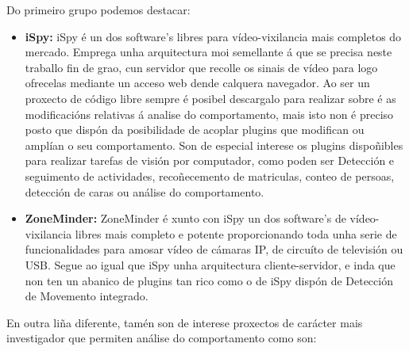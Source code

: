         Do primeiro grupo podemos destacar:
        \begin{itemize}
         \item \textbf{iSpy:}\cite{iSpy-webpage}
            iSpy é un dos software's libres para vídeo-vixilancia mais completos do mercado. Emprega
            unha arquitectura moi semellante á que se precisa neste traballo fin de grao, cun 
            servidor que recolle os sinais de vídeo para logo ofrecelas mediante un acceso web 
            dende calquera navegador. 
            Ao ser un proxecto de código libre sempre é posibel descargalo para realizar sobre é as
            modificacións relativas á analise do comportamento, mais isto non é preciso posto que 
            dispón da posibilidade de acoplar plugins que modifican ou amplían o seu comportamento.
            Son de especial interese os plugins dispoñibles para realizar tarefas de visión por
            computador\cite{iSpy-plugins}, como poden ser Detección e seguimento de actividades,
            recoñecemento de matriculas, conteo de persoas, detección de caras ou análise do 
            comportamento.
         \item \textbf{ZoneMinder:} \cite{zoneMinder-webPage}
            ZoneMinder é xunto con iSpy un dos software's de vídeo-vixilancia libres mais completo
            e potente proporcionando toda unha serie de funcionalidades para amosar vídeo de cámaras
            IP, de circuíto de televisión ou USB. Segue ao igual que iSpy unha arquitectura 
            cliente-servidor, e inda que non ten un abanico de plugins tan rico como o de iSpy 
            dispón de Detección de Movemento integrado\cite{zoneMinder-motion-detection}.
        \end{itemize}
        
        En outra liña diferente, tamén son de interese proxectos de carácter mais investigador que 
        permiten análise do comportamento como son:
        
